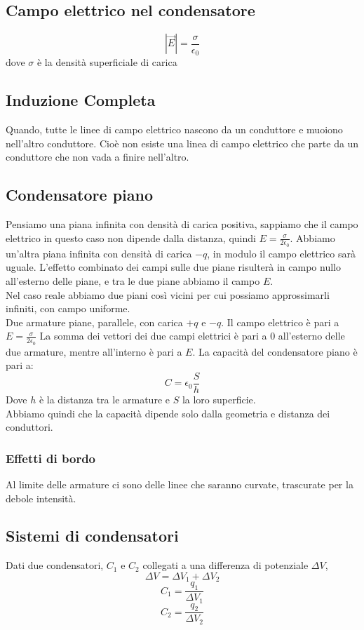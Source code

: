\documentclass[a4paper]{report}
\begin{document}
  \subsection{Campo elettrico nel condensatore}
  $$ |\vec{E}| = \frac{\sigma}{\epsilon_0} $$
  dove $\sigma$ è la densità superficiale di carica

  \subsection{Induzione Completa}
  Quando, tutte le linee di campo elettrico nascono da un conduttore e muoiono nell'altro conduttore. Cioè non esiste una linea di campo elettrico che parte da un conduttore che non vada a finire nell'altro.

  \subsection{Condensatore piano}
  Pensiamo una piana infinita con densità di carica positiva, sappiamo che il campo elettrico in questo caso non dipende dalla distanza, quindi $E= \frac{\sigma}{2\epsilon_0}$. Abbiamo un'altra piana infinita con densità di carica $-q$, in modulo il campo elettrico sarà uguale.
  L'effetto combinato dei campi sulle due piane risulterà in campo nullo all'esterno delle piane, e tra le due piane abbiamo il campo $E$.\\
  Nel caso reale abbiamo due piani così vicini per cui possiamo approssimarli infiniti, con campo uniforme.\\
  Due armature piane, parallele, con carica $+q$ e $-q$.
  Il campo elettrico è pari a \( E = \frac{\sigma}{2\epsilon_0} \)
  La somma dei vettori dei due campi elettrici è pari a $0$ all'esterno delle due armature, mentre all'interno è pari a $E$. La capacità del condensatore piano è pari a:
  $$ C = \epsilon_0 \frac{S}{h} $$
  Dove $h$ è la distanza tra le armature e $S$ la loro superficie.\\
  Abbiamo quindi che la capacità dipende solo dalla geometria e distanza dei conduttori.

  \subsubsection{Effetti di bordo}
  Al limite delle armature ci sono delle linee che saranno curvate, trascurate per la debole intensità.

  \subsection{Sistemi di condensatori}
  Dati due condensatori, $C_1$ e $C_2$ collegati a una differenza di potenziale $\Delta V$,
  $$ \Delta V = \Delta V_1 + \Delta V_2 $$
  $$ C_1 = \frac{q_1}{\Delta V_1} $$
  $$ C_2 = \frac{q_2}{\Delta V_2} $$
\end{document}
